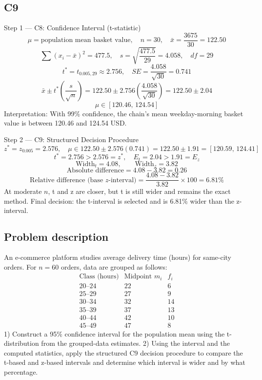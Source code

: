 \begin{ExamProblems}
		\subsection*{C9}
		Step 1 --- C8: Confidence Interval (t-statistic)
		\[
		\mu=\text{population mean basket value},\quad n=30,\quad \bar{x}=\frac{3675}{30}=122.50
		\]
		\[
		\sum (x_i-\bar{x})^2=477.5,\quad s=\sqrt{\frac{477.5}{29}}=4.058,\quad df=29
		\]
		\[
		t^*=t_{0.005,29}\approx 2.756,\quad SE=\frac{4.058}{\sqrt{30}}=0.741
		\]
		\[
		\bar{x}\pm t^*\left(\frac{s}{\sqrt{n}}\right)=122.50\pm 2.756\left(\frac{4.058}{\sqrt{30}}\right)=122.50\pm 2.04
		\]
		\[
		\mu\in[120.46,\,124.54]
		\]
		Interpretation: With 99\% confidence, the chain's mean weekday-morning basket value is between 120.46 and 124.54 USD.

		Step 2 --- C9: Structured Decision Procedure
		\[
		z^*=z_{0.005}=2.576,\quad \mu\in 122.50\pm 2.576(0.741)=122.50\pm 1.91=[120.59,\,124.41]
		\]
		\[
		t^*=2.756>2.576=z^*,\quad E_t=2.04>1.91=E_z
		\]
		\[
		\text{Width}_t=4.08,\qquad \text{Width}_z=3.82
		\]
		\[
		\text{Absolute difference}=4.08-3.82=0.26
		\]
		\[
		\text{Relative difference (base }z\text{-interval)}=\frac{4.08-3.82}{3.82}\times 100=6.81\%
		\]
		At moderate $n$, t and z are closer, but t is still wider and remains the exact method.
		Final decision: the t-interval is selected and is 6.81\% wider than the z-interval.

		\newpage
		\item
		\subsection*{Problem description}
		An e-commerce platform studies average delivery time (hours) for same-city orders.
		For $n=60$ orders, data are grouped as follows:
		\[
		\begin{array}{c|c|c}
		\text{Class (hours)} & \text{Midpoint }m_i & f_i\\\hline
		20\text{--}24 & 22 & 6\\
		25\text{--}29 & 27 & 9\\
		30\text{--}34 & 32 & 14\\
		35\text{--}39 & 37 & 13\\
		40\text{--}44 & 42 & 10\\
		45\text{--}49 & 47 & 8
		\end{array}
		\]
		1) Construct a 95\% confidence interval for the population mean using the t-distribution from the grouped-data estimates.
		2) Using the interval and the computed statistics, apply the structured C9 decision procedure to compare the t-based and z-based intervals and determine which interval is wider and by what percentage.


\end{ExamProblems}
